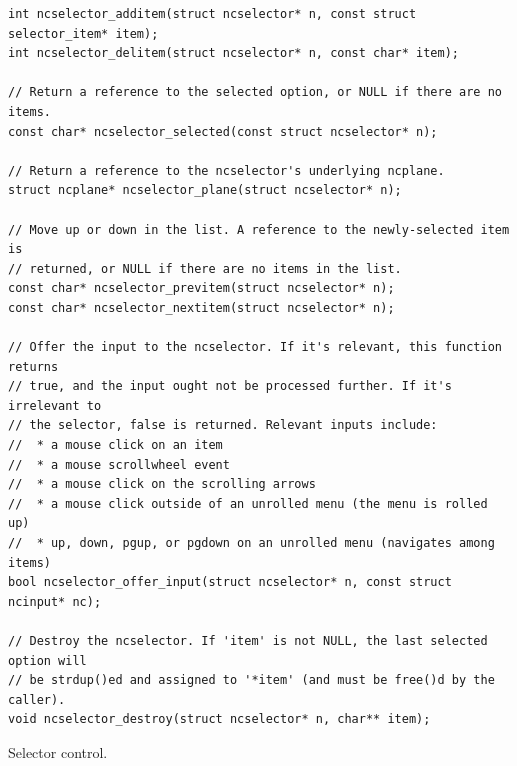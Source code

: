 \documentclass[letterpaper,10pt]{article}
\begin{document}
\begin{listing}[!htbp]
\begin{verbatim}
int ncselector_additem(struct ncselector* n, const struct selector_item* item);
int ncselector_delitem(struct ncselector* n, const char* item);

// Return a reference to the selected option, or NULL if there are no items.
const char* ncselector_selected(const struct ncselector* n);

// Return a reference to the ncselector's underlying ncplane.
struct ncplane* ncselector_plane(struct ncselector* n);

// Move up or down in the list. A reference to the newly-selected item is
// returned, or NULL if there are no items in the list.
const char* ncselector_previtem(struct ncselector* n);
const char* ncselector_nextitem(struct ncselector* n);

// Offer the input to the ncselector. If it's relevant, this function returns
// true, and the input ought not be processed further. If it's irrelevant to
// the selector, false is returned. Relevant inputs include:
//  * a mouse click on an item
//  * a mouse scrollwheel event
//  * a mouse click on the scrolling arrows
//  * a mouse click outside of an unrolled menu (the menu is rolled up)
//  * up, down, pgup, or pgdown on an unrolled menu (navigates among items)
bool ncselector_offer_input(struct ncselector* n, const struct ncinput* nc);

// Destroy the ncselector. If 'item' is not NULL, the last selected option will
// be strdup()ed and assigned to '*item' (and must be free()d by the caller).
void ncselector_destroy(struct ncselector* n, char** item);
\end{verbatim}
\caption{Selector control.}
\end{listing}
\end{document}
